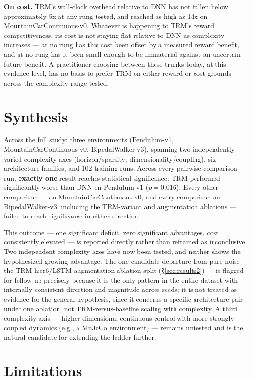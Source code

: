 \documentclass[11pt]{article}
\begin{document}
\textbf{On cost.} TRM's wall-clock overhead relative to DNN has not fallen below approximately 5x at any rung tested, and reached as high as 14x on MountainCarContinuous-v0. Whatever is happening to TRM's reward competitiveness, its cost is not staying flat relative to DNN as complexity increases --- at no rung has this cost been offset by a measured reward benefit, and at no rung has it been small enough to be immaterial against an uncertain future benefit. A practitioner choosing between these trunks today, at this evidence level, has no basis to prefer TRM on either reward or cost grounds across the complexity range tested.

\section{Synthesis}

Across the full study: three environments (Pendulum-v1, MountainCarContinuous-v0, BipedalWalker-v3), spanning two independently varied complexity axes (horizon/sparsity; dimensionality/coupling), six architecture families, and 102 training runs. Across every pairwise comparison run, \textbf{exactly one} result reaches statistical significance: TRM performed significantly worse than DNN on Pendulum-v1 ($p=0.016$). Every other comparison --- on MountainCarContinuous-v0, and every comparison on BipedalWalker-v3, including the TRM-variant and augmentation ablations --- failed to reach significance in either direction.

This outcome --- one significant deficit, zero significant advantages, cost consistently elevated --- is reported directly rather than reframed as inconclusive. Two independent complexity axes have now been tested, and neither shows the hypothesized growing advantage. The one candidate departure from pure noise --- the TRM-hier6/LSTM augmentation-ablation split (\S\ref{sec:results2}) --- is flagged for follow-up precisely because it is the only pattern in the entire dataset with internally consistent direction and magnitude across seeds; it is not treated as evidence for the general hypothesis, since it concerns a specific architecture pair under one ablation, not TRM-versus-baseline scaling with complexity. A third complexity axis --- higher-dimensional continuous control with more strongly coupled dynamics (e.g., a MuJoCo environment) --- remains untested and is the natural candidate for extending the ladder further.

\section{Limitations}
\label{sec:limitations}
\end{document}
